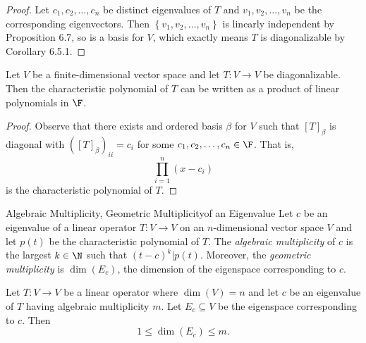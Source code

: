 \documentclass[linearalgebra]{subfiles}
\begin{document}
    \begin{proof}
        Let $c_1, c_2, \ldots, c_n$ be distinct eigenvalues of $T$ and $v_1, v_2, \ldots, v_n$ be the corresponding eigenvectors. Then $\left\lbrace v_1, v_2, \ldots, v_n \right\rbrace$ is linearly independent by Proposition 6.7, so is a basis for $V$, which exactly means $T$ is diagonalizable by Corollary 6.5.1.
    \end{proof}

    \begin{prop}{}
        Let $V$ be a finite-dimensional vector space and let $T:V\to V$ be diagonalizable. Then the characteristic polynomial of $T$ can be written as a product of linear polynomials in $\F$.
    \end{prop}

    \begin{proof}
        Observe that there exists and ordered basis $\beta$ for $V$ such that $[T]_\beta$ is diagonal with $\left( \left[ T \right] _\beta \right) _{ii} = c_i$ for some $c_1,c_2,\ldots,c_n\in\F$. That is,
        \begin{equation*}
            \prod^{n}_{i=1} \left( x-c_i \right) 
        \end{equation*}
        is the characteristic polynomial of $T$.
    \end{proof}

    \begin{definition}{Algebraic Multiplicity, Geometric Multiplicity}{of an Eigenvalue}
        Let $c$ be an eigenvalue of a linear operator $T:V\to V$ on an $n$-dimensional vector space $V$ and let $p(t)$ be the characteristic polynomial of $T$. The \emph{algebraic multiplicity} of $c$ is the largest $k\in \N$ such that $(t-c)^k|p(t)$. Moreover, the \emph{geometric multiplicity} is $\dim \left( E_c \right)$, the dimension of the eigenspace corresponding to $c$.
    \end{definition}

    \clearpage
    \begin{prop}{}
        Let $T:V\to V$ be a linear operator where $\dim(V) = n$ and let $c$ be an eigenvalue of $T$ having algebraic multiplicity $m$. Let $E_c\subseteq V$ be the eigenspace corresponding to $c$. Then
        \begin{equation*}
            1\leq \dim \left( E_c \right)\leq m.
        \end{equation*}
    \end{prop}
\end{document}
